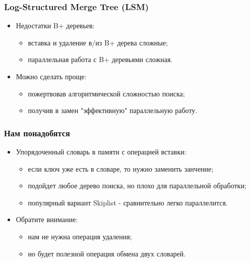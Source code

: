 \begin{frame}
\frametitle{Log-Structured Merge Tree (LSM)}
\begin{itemize}
  \item Недостатки B+ деревьев:
  \begin{itemize}
    \item вставка и удаление в/из B+ дерева сложные;
    \item параллельная работа с B+ деревьями сложная.
  \end{itemize}
  \item Можно сделать проще:
  \begin{itemize}
    \item пожертвовав алгоритмической сложностью поиска;
    \item получив в замен "эффективную" параллельную работу.
  \end{itemize}
\end{itemize}
\end{frame}

\begin{frame}
\frametitle{Нам понадобятся}
\begin{itemize}
  \item Упорядоченный словарь в памяти с операцией вставки:
  \begin{itemize}
    \item если ключ уже есть в словаре, то нужно заменить занчение;
    \item подойдет любое дерево поиска, но плохо для параллельной обработки;
    \item популярный вариант Skiplist - сравнительно легко параллелится.
  \end{itemize}
  \item Обратите внимание:
  \begin{itemize}
    \item нам не нужна операция удаления;
    \item но будет полезной операция обмена двух словарей.
  \end{itemize}
\end{itemize}
\end{frame}


